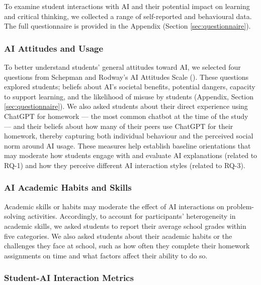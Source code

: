\documentclass[
  11pt,
]{article}
\begin{document}
To examine student interactions with AI and their potential impact on learning and critical thinking, we collected a range of self-reported and behavioural data. The full questionnaire is provided in the Appendix (Section \ref{sec:questionnaire}).

\subsubsection{AI Attitudes and Usage}\label{ai-attitudes-and-usage}

To better understand students' general attitudes toward AI, we selected four questions from Schepman and Rodway's AI Attitudes Scale (). These questions explored students; beliefs about AI's societal benefits, potential dangers, capacity to support learning, and the likelihood of misuse by students (Appendix, Section \ref{sec:questionnaire}). We also asked students about their direct experience using ChatGPT for homework --- the most common chatbot at the time of the study --- and their beliefs about how many of their peers use ChatGPT for their homework, thereby capturing both individual behaviour and the perceived social norm around AI usage. These measures help establish baseline orientations that may moderate how students engage with and evaluate AI explanations (related to RQ-1) and how they perceive different AI interaction styles (related to RQ-3).

\subsubsection{AI Academic Habits and Skills}\label{ai-academic-habits-and-skills}

Academic skills or habits may moderate the effect of AI interactions on problem-solving activities. Accordingly, to account for participants' heterogeneity in academic skills, we asked students to report their average school grades within five categories. We also asked students about their academic habits or the challenges they face at school, such as how often they complete their homework assignments on time and what factors affect their ability to do so.

\subsubsection{Student-AI Interaction Metrics}\label{student-ai-interaction-metrics}
\end{document}

